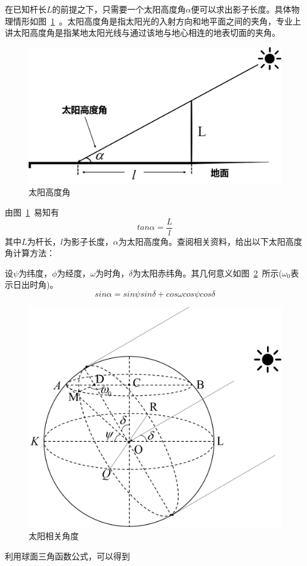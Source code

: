 \documentclass[12pt]{cumcmart}   %
\begin{document}
在已知杆长$L$的前提之下，只需要一个太阳高度角$\alpha$便可以求出影子长度。具体物理情形如图~\ref{tan}~。太阳高度角是指太阳光的入射方向和地平面之间的夹角，专业上讲太阳高度角是指某地太阳光线与通过该地与地心相连的地表切面的夹角。
\begin{figure}[H]
	\centering
	\includegraphics[scale=0.3]{images/tan.png}
	\caption{太阳高度角}
	\label{tan}
\end{figure}
由图~\ref{tan}~易知有
\begin{equation}
tan \alpha=\frac{L}{l}
\end{equation}
其中$L$为杆长，$l$为影子长度，$\alpha$为太阳高度角。查阅相关资料，给出以下太阳高度角计算方法：

设$\psi$为纬度，$\phi$为经度，$\omega$为时角，$\delta$为太阳赤纬角。其几何意义如图~\ref{xiangguanjiao}~所示($\omega_0$表示日出时角)。
\begin{equation}
sin \alpha=sin \psi sin\delta +cos \omega cos \psi cos \delta
\label{qiumian}
\end{equation}
\begin{figure}[h]
	\centering
	\includegraphics[scale=0.4]{images/diqiu.png}
	\caption{太阳相关角度}
	\label{xiangguanjiao}
\end{figure}
利用球面三角函数公式，可以得到
\end{document}
